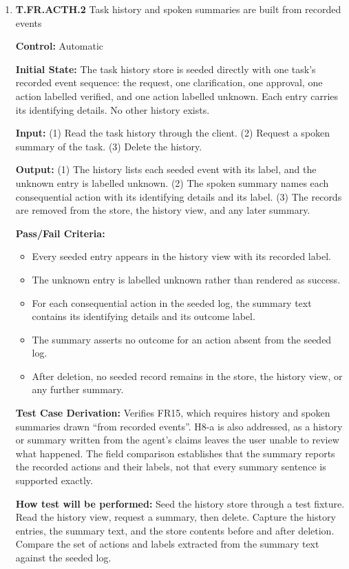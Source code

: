 \documentclass[12pt, titlepage]{article}
\begin{document}
\begin{enumerate}
\item{\textbf{T.FR.ACTH.2} Task history and spoken summaries are built from recorded events\\}\label{test:T.FR.ACTH.2}

\textbf{Control:} Automatic

\textbf{Initial State:} The task history store is seeded directly with one task's recorded event sequence: the request, one
clarification, one approval, one action labelled verified, and one action labelled unknown. Each entry carries its identifying
details. No other history exists.

\textbf{Input:} (1) Read the task history through the client. (2) Request a spoken summary of the task. (3) Delete the history.

\textbf{Output:} (1) The history lists each seeded event with its label, and the unknown entry is labelled unknown. (2) The
spoken summary names each consequential action with its identifying details and its label. (3) The records are removed from
the store, the history view, and any later summary.

\textbf{Pass/Fail Criteria:}
\begin{itemize}
  \item Every seeded entry appears in the history view with its recorded label.
  \item The unknown entry is labelled unknown rather than rendered as success.
  \item For each consequential action in the seeded log, the summary text contains its identifying details and its outcome label.
  \item The summary asserts no outcome for an action absent from the seeded log.
  \item After deletion, no seeded record remains in the store, the history view, or any further summary.
\end{itemize}

\textbf{Test Case Derivation:} Verifies FR15, which requires history and spoken summaries drawn ``from recorded events''. 
H8-a is also addressed, as a history or summary written from the agent's claims leaves the user unable to review what happened. 
The field comparison establishes that the summary reports the recorded actions and their labels, not that every summary sentence is supported exactly.

\textbf{How test will be performed:} Seed the history store through a test fixture. Read the history view, request a summary,
then delete. Capture the history entries, the summary text, and the store contents before and after deletion. Compare the set
of actions and labels extracted from the summary text against the seeded log.


\end{enumerate}
\end{document}
